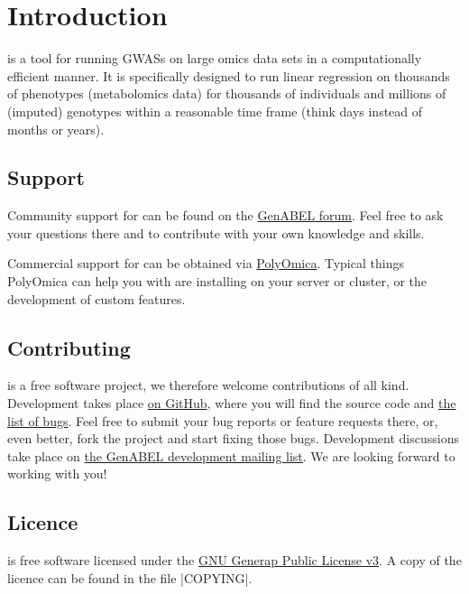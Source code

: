 \chapter{Introduction}
\oanomm is a tool for running \acp{GWAS} on large omics data sets in a
computationally efficient manner. It is specifically designed to run
linear regression on thousands of phenotypes (\eg metabolomics data)
for thousands of individuals and millions of (imputed) genotypes
within a reasonable time frame (think days instead of months or
years).

\section{Support}
Community support for \oanomm can be found on the
\href{http://forum.genabel.org}{GenABEL forum}. Feel free to ask your
questions there and to contribute with your own knowledge and skills.

Commercial support for \oannomm can be obtained via
\href{http://www.polyomica.com}{PolyOmica}. Typical things PolyOmica
can help you with are installing \oanomm on your server or
cluster, or the development of custom features.

\section{Contributing}
\oanomm is a free software project, we therefore welcome contributions
of all kind. Development takes place
\href{https://github.com/GenABEL-Project/OmicABELnoMM}{on GitHub},
where you will find the source code and
\href{https://github.com/GenABEL-Project/OmicABELnoMM/issues}{the list
  of bugs}. Feel free to submit your bug reports or feature requests
there, or, even better, fork the project and start fixing those bugs.
Development discussions take place on
\href{https://lists.r-forge.r-project.org/mailman/listinfo/genabel-devel}{the
  GenABEL development mailing list}. We are looking forward to working
with you!

\section{Licence}
\oanomm is free software licensed under the
\href{https://www.gnu.org/licenses/gpl.html}{GNU Generap Public
  License v3}. A copy of the licence can be found in the file
|COPYING|.



